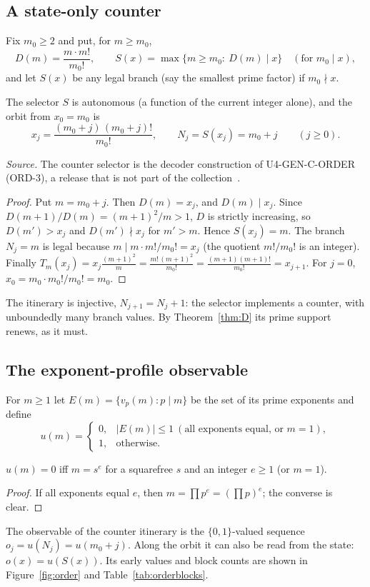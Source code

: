 \subsection{A state-only counter}
Fix $m_0\ge2$ and put, for $m\ge m_0$,
\[
D(m)=\frac{m\cdot m!}{m_0!},\qquad S(x)=\max\{m\ge m_0:\ D(m)\mid x\}\quad(\text{for }m_0\mid x),
\]
and let $S(x)$ be any legal branch (say the smallest prime factor) if $m_0\nmid x$.
\begin{theorem}\label{thm:ordS}
The selector $S$ is autonomous (a function of the current integer alone), and the orbit from $x_0=m_0$ is
\[
x_j=\frac{(m_0+j)\,(m_0+j)!}{m_0!},\qquad N_j=S(x_j)=m_0+j\qquad(j\ge0).
\]
\end{theorem}
\noindent\emph{Source.} The counter selector is the decoder construction of U4-GEN-C-ORDER~\cite{u4order} (ORD-3), a release that is not part of the collection~\cite{coll}.
\begin{proof}
Put $m=m_0+j$. Then $D(m)=x_j$, and $D(m)\mid x_j$. Since $D(m+1)/D(m)=(m+1)^2/m>1$, $D$ is strictly increasing, so $D(m')>x_j$ and $D(m')\nmid x_j$ for $m'>m$. Hence $S(x_j)=m$. The branch $N_j=m$ is legal because $m\mid m\cdot m!/m_0!=x_j$ (the quotient $m!/m_0!$ is an integer). Finally $T_m(x_j)=x_j\frac{(m+1)^2}m=\frac{m!\,(m+1)^2}{m_0!}=\frac{(m+1)(m+1)!}{m_0!}=x_{j+1}$. For $j=0$, $x_0=m_0\cdot m_0!/m_0!=m_0$. \end{proof}
The itinerary is injective, $N_{j+1}=N_j+1$: the selector implements a counter, with unboundedly many branch values. By Theorem~\ref{thm:D} its prime support renews, as it must.

\subsection{The exponent-profile observable}
For $m\ge1$ let $E(m)=\{v_p(m):p\mid m\}$ be the set of its prime exponents and define
\[
u(m)=\begin{cases}0,&|E(m)|\le1\ (\text{all exponents equal, or }m=1),\\ 1,&\text{otherwise.}\end{cases}
\]
\begin{lemma}\label{lem:u}
$u(m)=0$ iff $m=s^e$ for a squarefree $s$ and an integer $e\ge1$ (or $m=1$).
\end{lemma}
\begin{proof} If all exponents equal $e$, then $m=\prod p^e=(\prod p)^e$; the converse is clear. \end{proof}
The observable of the counter itinerary is the $\{0,1\}$-valued sequence $o_j=u(N_j)=u(m_0+j)$. Along the orbit it can also be read from the state: $o(x)=u(S(x))$. Its early values and block counts are shown in Figure~\ref{fig:order} and Table~\ref{tab:orderblocks}.

